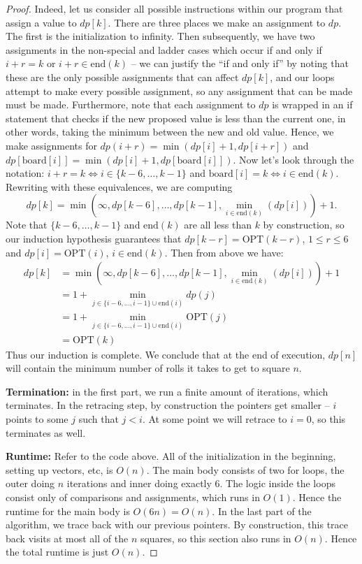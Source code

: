 \documentclass[10pt]{article}
\newcommand{\OPT}{\text{OPT}}
\begin{document}
\begin{proof}
  Indeed, let us consider all possible instructions within our program that assign a value to \(dp[k]\). There are three places we make an assignment to \(dp\). The first is the initialization to infinity. Then subsequently, we have two assignments in the non-special and ladder cases which occur if and only if \(i + r = k\) or \(i + r \in \text{end}(k)\) -- we can justify the ``if and only if'' by noting that these are the only possible assignments that can affect \(dp[k]\), and our loops attempt to make every possible assignment, so any assignment that can be made must be made. 
  Furthermore, note that each assignment to \(dp\) is wrapped in an if statement that checks if the new proposed value is less than the current one, in other words, taking the minimum between the new and old value. Hence, we make assignments for \(dp(i + r) = \min(dp[i] + 1, dp[i + r])\) and \(dp[\text{board}[i]] = \min(dp[i] + 1, dp[\text{board}[i]])\). Now let's look through the notation: \(i + r = k \iff i \in \{k - 6, \ldots, k - 1\}\) and \(\text{board}[i] = k \iff i \in \text{end}(k)\). Rewriting with these equivalences, we are computing
  \[dp[k] = \min(\infty, dp[k - 6], \ldots, dp[k - 1], \min_{i \in \text{end}(k)}(dp[i])) + 1.\]
  Note that \(\{k - 6, \ldots, k - 1\}\) and \(\text{end}(k)\) are all less than \(k\) by construction, so our induction hypothesis guarantees that \(dp[k - r] = \OPT(k - r)\), \(1 \leq r \leq 6\) and \(dp[i] = \OPT(i)\), \(i \in \text{end}(k)\). Then from above we have: 
  \begin{align*}
    dp[k] &= \min(\infty, dp[k - 6], \ldots, dp[k - 1], \min_{i \in \text{end}(k)}(dp[i])) + 1 \\ 
    &= 1 + \min_{j \in \{i - 6, \ldots, i - 1\} \cup \text{end}(i)}dp(j) \\ 
    &= 1 + \min_{j \in \{i - 6, \ldots, i - 1\} \cup \text{end}(i)}\OPT(j) \\ 
    &= \OPT(k)
  \end{align*}
  Thus our induction is complete. We conclude that at the end of execution, \(dp[n]\) will contain the minimum number of rolls it takes to get to square \(n\). 
  
  \textbf{Termination:} in the first part, we run a finite amount of iterations, which terminates. In the retracing step, by construction the pointers get smaller -- \(i\) points to some \(j\) such that \(j < i\). At some point we will retrace to \(i = 0\), so this terminates as well.

  \textbf{Runtime:} Refer to the code above. All of the initialization in the beginning, setting up vectors, etc, is \(O(n)\). The main body consists of two for loops, the outer doing \(n\) iterations and inner doing exactly \(6\). The logic inside the loops consist only of comparisons and assignments, which runs in \(O(1)\). Hence the runtime for the main body is \(O(6n) = O(n)\). In the last part of the algorithm, we trace back with our previous pointers. By construction, this trace back visits at most all of the \(n\) squares, so this section also runs in \(O(n)\). Hence the total runtime is just \(O(n)\).


\end{proof}
\end{document}
